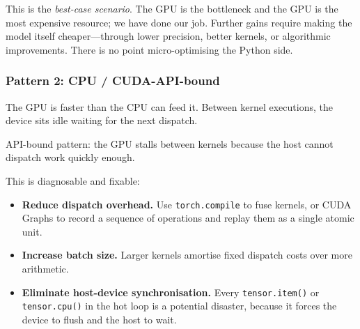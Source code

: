 \documentclass[11pt,a4paper]{article}
\theoremstyle{definition}
\theoremstyle{remark}
\theoremstyle{plain}
\begin{document}
This is the \emph{best-case scenario}. The GPU is the bottleneck and the
GPU is the most expensive resource; we have done our job. Further gains
require making the model itself cheaper---through lower precision, better
kernels, or algorithmic improvements. There is no point
micro-optimising the Python side.

\subsubsection*{Pattern 2: CPU / CUDA-API-bound}

The GPU is faster than the CPU can feed it. Between kernel executions, the
device sits idle waiting for the next dispatch.

\begin{center}
\par\smallskip
{\small API-bound pattern: the GPU stalls between kernels because the host
cannot dispatch work quickly enough.}
\end{center}

This is diagnosable and fixable:
\begin{itemize}[leftmargin=1.5em, itemsep=2pt]
    \item \textbf{Reduce dispatch overhead.} Use \texttt{torch.compile} to
          fuse kernels, or CUDA Graphs to record a sequence of operations
          and replay them as a single atomic unit.
    \item \textbf{Increase batch size.} Larger kernels amortise fixed
          dispatch costs over more arithmetic.
    \item \textbf{Eliminate host-device synchronisation.} Every
          \texttt{tensor.item()} or \texttt{tensor.cpu()} in the hot loop
          is a potential disaster, because it forces the device to flush
          and the host to wait.
\end{itemize}
\end{document}
